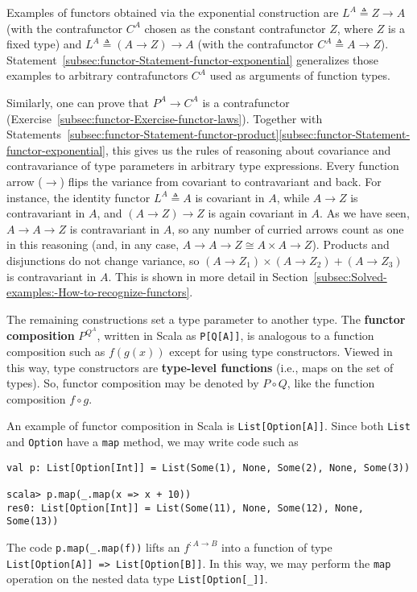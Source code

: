 Examples of functors obtained via the exponential
construction are $L^{A}\triangleq Z\rightarrow A$ (with the contrafunctor
$C^{A}$ chosen as the constant contrafunctor $Z$, where $Z$ is
a fixed type) and $L^{A}\triangleq\left(A\rightarrow Z\right)\rightarrow A$
(with the contrafunctor $C^{A}\triangleq A\rightarrow Z$). Statement~\ref{subsec:functor-Statement-functor-exponential}
generalizes those examples to arbitrary contrafunctors $C^{A}$ used
as arguments of function types.

Similarly, one can prove that $P^{A}\rightarrow C^{A}$ is a contrafunctor
(Exercise~\ref{subsec:functor-Exercise-functor-laws}). Together
with Statements~\ref{subsec:functor-Statement-functor-product}\textendash \ref{subsec:functor-Statement-functor-exponential},
this gives us the rules of reasoning about covariance and contravariance
of type parameters in arbitrary type expressions. Every function arrow
($\rightarrow$) flips the variance from covariant to contravariant
and back. For instance, the identity functor $L^{A}\triangleq A$
is covariant in $A$, while $A\rightarrow Z$ is contravariant in
$A$, and $\left(A\rightarrow Z\right)\rightarrow Z$ is again covariant
in $A$. As we have seen, $A\rightarrow A\rightarrow Z$ is contravariant
in $A$, so any number of curried arrows count as one in this reasoning
(and, in any case, $A\rightarrow A\rightarrow Z\cong A\times A\rightarrow Z$).
Products and disjunctions do not change variance, so $\left(A\rightarrow Z_{1}\right)\times\left(A\rightarrow Z_{2}\right)+\left(A\rightarrow Z_{3}\right)$
is contravariant in $A$. This is shown in more detail in Section~\ref{subsec:Solved-examples:-How-to-recognize-functors}.

The remaining constructions set a type parameter to another type.
The \textbf{functor composition} $P^{Q^{A}}$,
written in Scala as \lstinline!P[Q[A]]!, is analogous to a function
composition such as $f(g(x))$ except for using type constructors.
Viewed in this way, type constructors are \textbf{type-level functions}
(i.e., maps on the set of types). So, functor composition may be denoted
by $P\circ Q$, like the function composition $f\circ g$.

An example of functor composition in Scala is \lstinline!List[Option[A]]!.
Since both \lstinline!List! and \lstinline!Option! have a \lstinline!map!
method, we may write code such as
\begin{lstlisting}
val p: List[Option[Int]] = List(Some(1), None, Some(2), None, Some(3))

scala> p.map(_.map(x => x + 10))
res0: List[Option[Int]] = List(Some(11), None, Some(12), None, Some(13)) 
\end{lstlisting}
The code \lstinline!p.map(_.map(f))! lifts an $f^{:A\rightarrow B}$
into a function of type \lstinline!List[Option[A]] => List[Option[B]]!.
In this way, we may perform the \lstinline!map! operation on the
nested data type \lstinline!List[Option[_]]!. 

